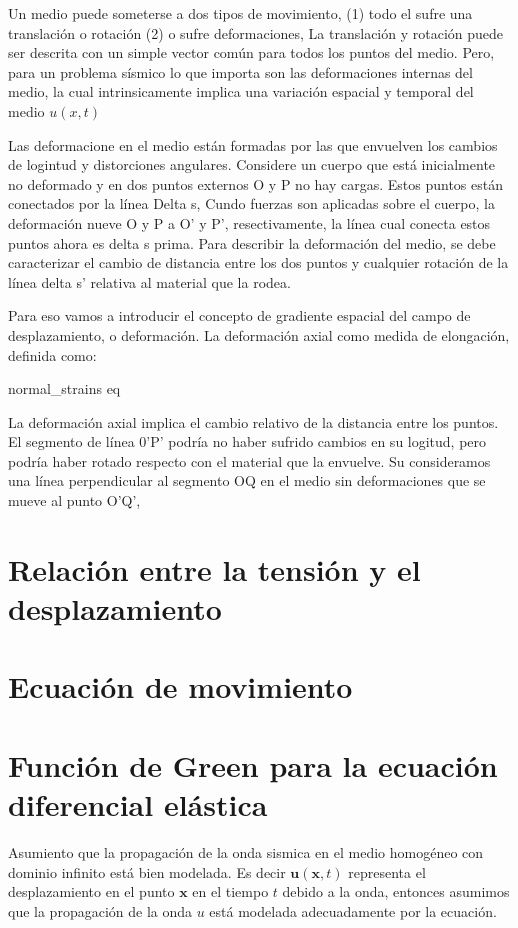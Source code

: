 Un medio puede someterse a  dos tipos de movimiento, (1) todo el sufre una
translación o rotación (2) o sufre deformaciones, La translación y rotación
puede ser descrita con un simple vector común para todos los puntos del medio.
Pero, para un problema sísmico lo que importa son las deformaciones internas del
medio, la cual intrinsicamente implica una variación espacial y temporal del
medio $u(x,t)$

Las deformacione en el medio están formadas por las que envuelven los cambios de
logintud y distorciones angulares. Considere un cuerpo que está inicialmente no
deformado y en dos puntos externos O y P no hay cargas. Estos puntos están
conectados por la línea Delta s, Cundo fuerzas son aplicadas sobre el cuerpo, la
deformación nueve O y P  a O’ y P’, resectivamente, la línea cual conecta estos
puntos ahora es delta s prima. Para describir la deformación del medio, se debe
caracterizar el cambio de distancia entre los dos puntos y cualquier rotación de
la línea delta s’ relativa al material que la rodea.

Para eso vamos a introducir el concepto de gradiente espacial del campo de
desplazamiento, o deformación. La deformación axial como medida de elongación,
definida como:

normal_strains eq

La deformación axial implica el cambio relativo de la distancia entre los
puntos. El segmento de línea 0’P’ podría no haber sufrido cambios en su logitud,
pero podría haber rotado respecto con el material que la envuelve. Su
consideramos una línea perpendicular al segmento OQ en el medio sin
deformaciones que se mueve al punto O’Q’,


\section{Relación entre la tensión y el desplazamiento}

\section{Ecuación de movimiento}

\section{Función de Green para la ecuación diferencial elástica}

Asumiento que la propagación de la onda sismica en el medio homogéneo con
dominio infinito está bien modelada. Es decir
$\mathbf{u}\left(\mathbf{x},t\right)$ representa el desplazamiento en el punto
$\mathbf{x}$ en el tiempo $t$ debido a la onda, entonces asumimos que la
propagación de la onda $u$ está modelada adecuadamente por la ecuación.

